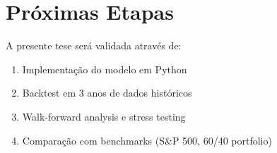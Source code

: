 \documentclass[12pt,a4paper]{article}
\begin{document}
\section{Próximas Etapas}

A presente tese será validada através de:
\begin{enumerate}
    \item Implementação do modelo em Python
    \item Backtest em 3 anos de dados históricos
    \item Walk-forward analysis e stress testing
    \item Comparação com benchmarks (S\&P 500, 60/40 portfolio)
\end{enumerate}
\end{document}
